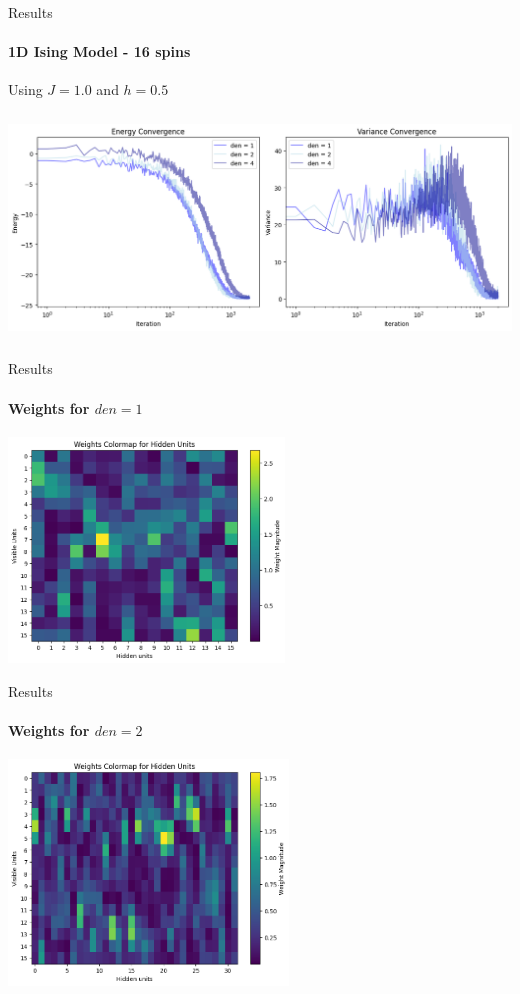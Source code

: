 \documentclass{beamer}
\begin{document}
\begin{frame}{Results}
\framesubtitle{1D Ising Model - 16 spins}
Using $J = 1.0$ and $h=0.5$
\begin{center}
\includegraphics[height=6cm]{images/16spin_history_j1.png}
\end{center}
\end{frame}

\begin{frame}{Results}
\framesubtitle{Weights for $den = 1$}
\begin{center}
\includegraphics[height=6cm]{images/16spin_den1_j1.png}
\end{center}
\end{frame}

\begin{frame}{Results}
\framesubtitle{Weights for $den = 2$}
\begin{center}
\includegraphics[height=6cm]{images/16spin_den2_j1.png}
\end{center}
\end{frame}
\end{document}
